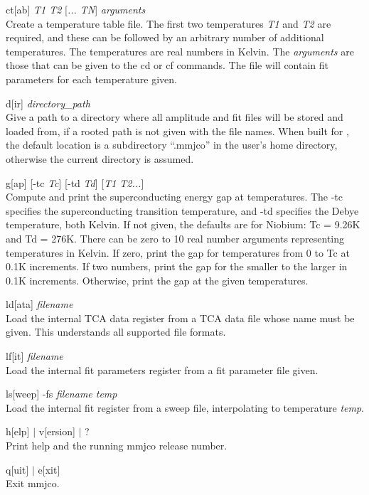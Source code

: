 \begin{description}
\item{{\vt ct}[{\vt ab}] {\it T1 T2} [{\it ... TN\/}] {\it arguments}\\
Create a temperature table file.  The first two temperatures {\it T1}
and {\it T2} are required, and these can be followed by an arbitrary
number of additional temperatures.  The temperatures are real numbers
in Kelvin.  The {\it arguments} are those that can be given to the
{\vt cd} or {\vt cf} commands.  The file will contain fit parameters
for each temperature given.}

\item{{\vt d}[{\vt ir}] {\it directory\_path}\\
Give a path to a directory where all amplitude and fit files will be
stored and loaded from, if a rooted path is not given with the file
names.  When built for {\XicTools}, the default location is a
subdirectory ``{\vt .mmjco}'' in the user's home directory, otherwise
the current directory is assumed.}

\item{{\vt g}[{\vt ap}] [{\vt -tc} {\it Tc\/}] [{\vt -td} {\it Td\/}]
  [{\it T1 T2...\/}]\\
Compute and print the superconducting energy gap at temperatures.  The
{\vt -tc} specifies the superconducting transition temperature, and
{\vt -td} specifies the Debye temperature, both Kelvin.  If not given,
the defaults are for Niobium:  Tc = 9.26K and Td = 276K.  There can be
zero to 10 real number arguments representing temperatures in Kelvin. 
If zero, print the gap for temperatures from 0 to Tc at 0.1K
increments.  If two numbers, print the gap for the smaller to the
larger in 0.1K increments.  Otherwise, print the gap at the given
temperatures.}

\item{{\vt ld}[{\vt ata}] {\it filename}\\
Load the internal TCA data register from a TCA data file whose name
must be given.  This understands all supported file formats.}

\item{{\vt lf}[{\vt it}] {\it filename}\\
Load the internal fit parameters register from a fit parameter file
given.}

\item{{\vt ls}[{\vt weep}] {\vt -fs} {\it filename temp}\\
Load the internal fit register from a sweep file, interpolating to
temperature {\it temp}.}

\item{{\vt h}[{\vt elp}] $|$ {\vt v}[{\vt ersion}] $|$ ?\\
Print help and the running mmjco release number.}

\item{{\vt q}[{\vt uit}] $|$ {\vt e}[{\vt xit}]\\
Exit {\vt mmjco}.}
\end{description}

